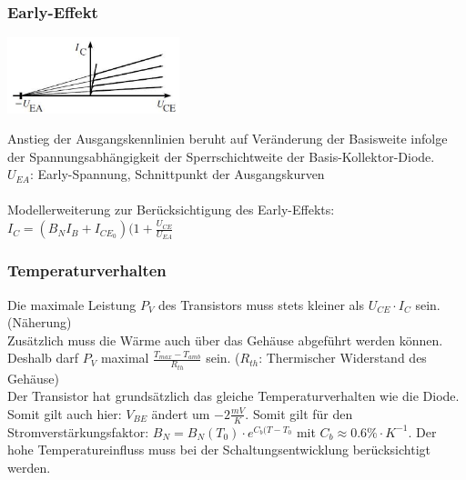 	\subsubsection{Early-Effekt}
		\begin{minipage}[c]{5cm}
			\includegraphics[width=5cm]{images/early-effekt}
		\end{minipage}
		\begin{minipage}[c]{12cm}
			Anstieg der Ausgangskennlinien beruht auf Veränderung der Basisweite infolge
			der Spannungsabhängigkeit der Sperrschichtweite der Basis-Kollektor-Diode. \\
			$U_{EA}$: Early-Spannung, Schnittpunkt der Ausgangskurven \\
			\\
			Modellerweiterung zur Berücksichtigung des Early-Effekts: \\
			$I_C = (B_NI_B+I_{CE_0})(1+\frac{U_{CE}}{U_{EA}}$
		\end{minipage}
		
	\subsubsection{Temperaturverhalten}
		Die maximale Leistung $P_V$ des Transistors muss stets kleiner als 
		$U_{CE} \cdot I_C$ sein. (Näherung) \\
		Zusätzlich muss die Wärme auch über das Gehäuse abgeführt werden können. Deshalb
		darf $P_V$ maximal $\frac{T_{max}-T_{amb}}{R_{th}}$ sein. ($R_{th}$: Thermischer
		Widerstand des Gehäuse) \\
		Der Transistor hat grundsätzlich das gleiche Temperaturverhalten wie die Diode. Somit
		gilt auch hier: $V_{BE}$ ändert um $-2\frac{mV}{K}$. Somit gilt für den
		Stromverstärkungsfaktor: $B_N=B_N(T_0)\cdot e^{C_b(T-T_0}$ mit 
		$C_b \approx 0.6\% \cdot K^{-1}$. Der hohe Temperatureinfluss muss bei der
		Schaltungsentwicklung berücksichtigt werden. \\
		
